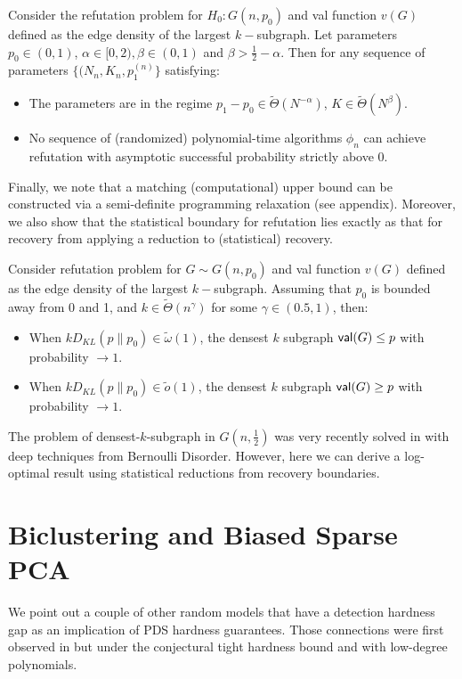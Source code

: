 \documentclass[final,12pt]{colt2023} %
\newcommand\1[1]{\mathbb{I}_{\left\{#1\right\}}}
\begin{document}
\begin{theorem}\label{REFUTEBound}
Consider the refutation problem for $H_0: G(n, p_0)$ and val function $v(G)$ defined as the edge density of the largest $k-$subgraph. Let parameters $p_0\in(0, 1)$, $\alpha\in[0,2), \beta\in (0,1)$ and $\beta>\frac{1}{2}-\alpha$. Then for any sequence of parameters $\{(N_n, K_n, p_1^{(n)}\}$ satisfying:
\begin{itemize}
\item The parameters are in the regime $p_1-p_0\in \tilde\Theta(N^{-\alpha})$, $K\in\tilde\Theta(N^\beta)$.
\item No sequence of (randomized) polynomial-time algorithms $\phi_n$ can achieve refutation with asymptotic successful probability strictly above $0$. 
\end{itemize}
\end{theorem}
Finally, we note that a matching (computational) upper bound can be constructed via a semi-definite programming relaxation (see appendix). Moreover, we also show that the statistical boundary for refutation lies exactly as that for recovery from applying a reduction to (statistical) recovery.
\begin{theorem}\label{statrefute}
Consider refutation problem for $G \sim G(n, p_0)$ and val function $v(G)$ defined as the edge density of the largest $k-$subgraph. Assuming that $p_0$ is bounded away from 0 and 1, and $k\in\tilde\Theta(n^{\gamma})$ for some $\gamma\in(0.5, 1)$, then:
\begin{itemize}
    \item When $kD_{KL}(p\| p_0)\in\tilde \omega(1)$, the densest $k$ subgraph $\mathsf{val}(G)\leq p$ with probability $\to 1$.
    \item  When $kD_{KL}(p\| p_0)\in\tilde o(1)$, the densest $k$ subgraph $\mathsf{val}(G)\geq p$ with probability $\to 1$.
\end{itemize}  
\end{theorem}
\begin{remark}
The problem of densest-$k$-subgraph in $G(n, \frac{1}{2})$ was very recently solved in \cite{cheairi2022densest} with deep techniques from Bernoulli Disorder. However, here we can derive a log-optimal result using statistical reductions from recovery boundaries.
\end{remark}


\section{Biclustering and Biased Sparse PCA}\label{OtherGaps}
We point out a couple of other random models that have a detection hardness gap as an implication of PDS hardness guarantees. Those connections were first observed in \cite{CLR17,BBH18} but under the conjectural tight hardness bound and \cite{SchrammWein} with low-degree polynomials.
\end{document}
